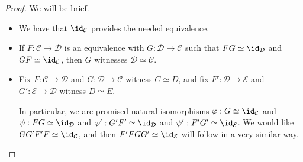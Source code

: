 \begin{proof}
	We will be brief.
	\begin{itemize}
		\item We have that $\id_\mathcal C$ provides the needed equivalence.
		\item If $F:\mathcal C\to\mathcal D$ is an equivalence with $G:\mathcal D\to\mathcal C$ such that $FG\simeq\id_\mathcal D$ and $GF\simeq\id_\mathcal C$, then $G$ witnesses $\mathcal D\simeq\mathcal C$.
		\item Fix $F:\mathcal C\to\mathcal D$ and $G:\mathcal D\to\mathcal C$ witness $C\simeq D$, and fix $F':\mathcal D\to\mathcal E$ and $G':\mathcal E\to\mathcal D$ witness $D\simeq E$.

		In particular, we are promised natural isomorphisms $\varphi:G\simeq\id_\mathcal C$ and $\psi:FG\simeq\id_\mathcal D$ and $\varphi':G'F'\simeq\id_\mathcal D$ and $\psi':F'G'\simeq\id_\mathcal E$. We would like $GG'F'F\simeq\id_\mathcal C$, and then $F'FGG'\simeq\id_\mathcal E$ will follow in a very similar way.


\end{itemize}
\end{proof}
